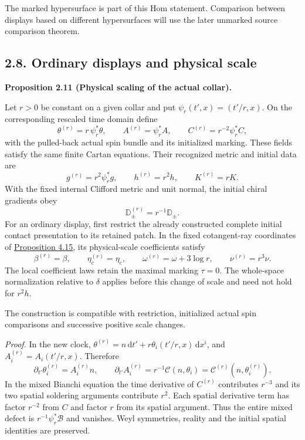 \documentclass[
  english,
  11pt,
  reqno]{amsart}
\makeatletter
\newcommand{\paperdisplaynext}{%
  \let\paper@savedstartsection\@startsection
  \def\@startsection##1##2##3##4##5##6{%
    \let\@startsection\paper@savedstartsection
    \@tempskipa ##5\relax
    \ifdim\@tempskipa<\z@
      \def\paper@afterskip{.35\baselineskip}%
    \else
      \def\paper@afterskip{##5}%
    \fi
    \@startsection{##1}{##2}{##3}{##4}{\paper@afterskip}{##6}}}
\newcommand{\paperdisplaysection}{\paperdisplaynext\subsection}
\newcommand{\pandocstatementheading}[1]{%
  \par\if@nobreak\else
    \addpenalty{\@beginparpenalty}%
    \addvspace{.5\baselineskip plus .2\baselineskip minus .2\baselineskip}%
  \fi
  {\normalfont\bfseries #1\par}%
  \nobreak\@afterindenttrue\@afterheading
}
\let\paper@displaysection\paperdisplaysection
\renewcommand{\paperdisplaysection}[1]{%
  \let\paper@savedhangfrom\@hangfrom
  \long\def\@hangfrom##1##2{%
    \paper@savedhangfrom{##1}{\paper@headingparagraph##2}}%
  \paper@displaysection{#1}%
  \let\@hangfrom\paper@savedhangfrom}
\makeatother
\begin{document}
The marked hypersurface is part of this Hom statement. Comparison
between displays based on different hypersurfaces will use the later
unmarked source comparison theorem.

\paperdisplaysection{2.8. Ordinary displays and physical
scale}\label{ordinary-displays-and-physical-scale}\label{sec:online-ordinary-collars-and-scale}

\pandocstatementheading{\leavevmode{}\label{prop:online-cartan-physical-scale}Proposition 2.11 (Physical scaling of the actual collar).}

Let \(r>0\) be constant on a given collar and put
\(\psi_r(t',x)=(t'/r,x)\). On the corresponding rescaled time domain
define%
 \[
\theta^{(r)}=r\,\psi_r^*\theta,
\qquad
A^{(r)}=\psi_r^*A,
\qquad
C^{(r)}=r^{-2}\psi_r^*C,
\] with the pulled-back actual spin bundle and its initialized marking.
These fields satisfy the same finite Cartan equations. Their recognized
metric and initial data are%
 \[
g^{(r)}=r^2\psi_r^*g,
\qquad
h^{(r)}=r^2h,
\qquad
K^{(r)}=rK.
\] With the fixed internal Clifford metric and unit normal, the initial
chiral gradients obey%
 \[
\mathbb D_\pm^{(r)}=r^{-1}\mathbb D_\pm.
\] For an ordinary display, first restrict the already constructed
complete initial contact presentation to its retained patch. In the
fixed cotangent-ray coordinates of
\hyperref[prop:online-contact-complete-kinematic-codec]{Proposition
4.15}, its physical-scale coefficients satisfy%
 \[
\beta^{(r)}=\beta,\qquad
\eta_c^{(r)}=\eta_c,\qquad
\omega^{(r)}=\omega+3\log r,
\qquad
\nu^{(r)}=r^3\nu.
\] The local coefficient laws retain the maximal marking \(\tau=0\). The
whole-space normalization relative to \(\delta\) applies before this
change of scale and need not hold for \(r^2h\).

The construction is compatible with restriction, initialized actual spin
comparisons and successive positive scale changes.

\emph{Proof.} In the new clock,
\(\theta^{(r)}=n\,\mathrm dt'+r\theta_i(t'/r,x)\,\mathrm dx^i\), and
\(A_i^{(r)}=A_i(t'/r,x)\). Therefore \[
\partial_{t'}\theta_i^{(r)}=A_i^{(r)}n,
\qquad
\partial_{t'}A_i^{(r)}
=r^{-1}\mathcal C(n,\theta_i)
=\mathcal C^{(r)}(n,\theta_i^{(r)}).
\] In the mixed Bianchi equation the time derivative of \(C^{(r)}\)
contributes \(r^{-3}\) and its two spatial soldering arguments
contribute \(r^2\). Each spatial derivative term has factor \(r^{-2}\)
from \(C\) and factor \(r\) from its spatial argument. Thus the entire
mixed defect is \(r^{-1}\psi_r^*\mathcal B\) and vanishes. Weyl
symmetries, reality and the initial spatial identities are preserved.
\end{document}
